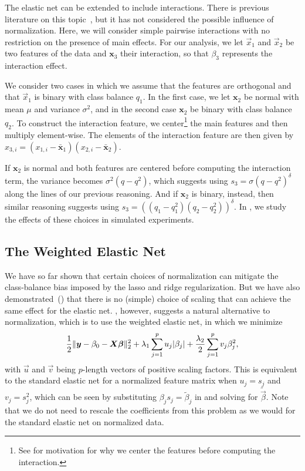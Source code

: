 The elastic net can be extended to include interactions. There is previous literature on
this topic~\citep{bien2013,zemlianskaia2022,lim2015}, but it has not considered the
possible influence of normalization. Here, we will consider simple pairwise interactions
with no restriction on the presence of main effects. For our analysis, we let \(\vec{x}_1\)
and \(\vec{x}_2\) be two features of the data and \(\bm{x}_3\) their interaction, so that
\(\beta_3\) represents the interaction effect.

We consider two cases in which we assume that the features are orthogonal and that
\(\vec{x}_1\) is binary with class balance \(q_1\). In the first case, we let \(\bm{x}_2\)
be normal with mean \(\mu\) and variance \(\sigma^2\), and in the second case \(\bm{x}_2\)
be binary with class balance \(q_2\). To construct the interaction feature, we
center\footnote{See  for motivation for why we center the
  features before computing the interaction.} the main features and then multiply
element-wise. The elements of the interaction feature are then given by \(x_{3,i} =
(x_{1,i} - \bar{\bm{x}}_1)(x_{2,i} - \bar{\bm{x}}_2)\).

If \(\bm{x}_2\) is normal and both features are centered before computing the interaction
term, the variance becomes \(\sigma^2 (q-q^2)\), which suggests using \(s_3 = \sigma (q -
q^2)^\delta\) along the lines of our previous reasoning. And if \(\bm{x}_2\) is binary,
instead, then similar reasoning suggests using \(s_3 = ((q_1-q_1^2)(q_2-q_2^2))^\delta\).
In , we study the effects of these choices in simulated
experiments.

\subsection{The Weighted Elastic Net}\label{sec:binary-weighting}

We have so far shown that certain choices of normalization can mitigate the class-balance
bias imposed by the lasso and ridge regularization. But we have also
demonstrated~() that there is no (simple) choice of
scaling that can achieve the same effect for the elastic net.
, however, suggests a natural alternative to normalization,
which is to use the weighted elastic net, in which we minimize
\[
  \frac{1}{2} \lVert \bm{y} - \beta_0 - \bm{X}\bm{\beta}\rVert_2^2 + \lambda_1 \sum_{j=1}^p u_j |\beta_j| + \frac{\lambda_2}{2} \sum_{j=1}^p v_j \beta_j^2,
\]
with \(\vec{u}\) and \(\vec{v}\) being \(p\)-length vectors of positive scaling factors.
This is equivalent to the standard elastic net for a normalized feature matrix when \(u_j =
s_j\) and \(v_j = s_j^2\), which can be seen by substituting \(\beta_js_j =
\tilde{\beta}_j\) in  and solving for \(\tilde{\vec{\beta}}\). Note
that we do not need to rescale the coefficients from this problem as we would for the
standard elastic net on normalized data.

